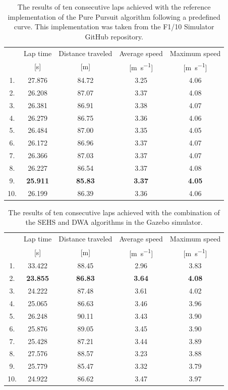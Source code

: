 \begin{table}
	\centering
	\label{tbl:reference-impl}
	\begin{tabular}{c c c c c}
		\toprule
		& Lap time       & Distance traveled  & Average speed             & Maximum speed             \\
		& [\si{\second}] & [\si{\meter}]      & [\si{\meter\per\second}]  & [\si{\meter\per\second}]  \\
		\midrule
		1. & 27.876 & 84.72 & 3.25 & 4.06 \\
		2. & 26.208 & 87.07 & 3.37 & 4.08 \\
		3. & 26.381 & 86.91 & 3.38 & 4.07 \\
		4. & 26.279 & 86.75 & 3.36 & 4.06 \\
		5. & 26.484 & 87.00 & 3.35 & 4.05 \\
		6. & 26.172 & 86.96 & 3.37 & 4.07 \\
		7. & 26.366 & 87.03 & 3.37 & 4.07 \\
		8. & 26.227 & 86.54 & 3.37 & 4.08 \\
		9. & \textbf{25.911} & \textbf{85.83} & \textbf{3.37} & \textbf{4.05} \\
		10. & 26.199 & 86.39 & 3.36 & 4.06 \\
	
		\bottomrule
	\end{tabular}
	\caption{The results of ten consecutive laps achieved with the reference implementation of the Pure Pursuit algorithm following a predefined curve. This implementation was taken from the F1/10 Simulator GitHub repository.}
\end{table}

\begin{table}
	\centering
	\label{tbl:dwa}
	\begin{tabular}{c c c c c}
		\toprule
		    & Lap time       & Distance traveled  & Average speed             & Maximum speed             \\
		    & [\si{\second}] & [\si{\meter}]      & [\si{\meter\per\second}]  & [\si{\meter\per\second}]  \\
		\midrule
		1. & 33.422 & 88.45 & 2.96 & 3.83 \\
		2. & \textbf{23.855} & \textbf{86.83} & \textbf{3.64} & \textbf{4.08} \\
		3. & 24.222 & 87.48 & 3.61 & 4.02 \\
		4. & 25.065 & 86.63 & 3.46 & 3.96 \\
		5. & 26.248 & 90.11 & 3.43 & 3.90 \\
		6. & 25.876 & 89.05 & 3.45 & 3.90 \\
		7. & 25.428 & 87.21 & 3.44 & 3.89 \\
		8. & 27.576 & 88.57 & 3.23 & 3.88 \\
		9. & 25.779 & 85.47 & 3.32 & 3.79 \\
		10.& 24.922 & 86.62 & 3.47 & 3.97 \\
		\bottomrule
	\end{tabular}
	\caption{The results of ten consecutive laps achieved with the combination of the SEHS and DWA algorithms in the Gazebo simulator.}
\end{table}

